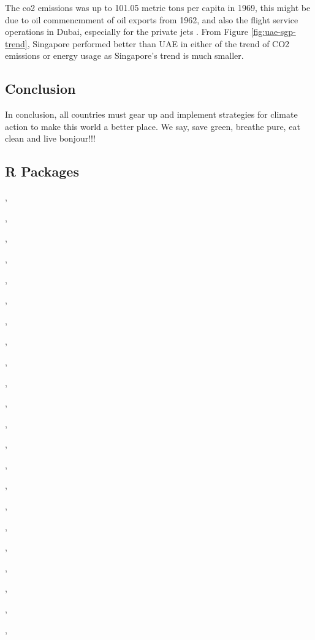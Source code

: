 \documentclass[11pt,a4paper,]{article}
\begin{document}
The co2 emissions was up to 101.05 metric tons per capita in 1969, this might be due to oil commencmment of oil exports from 1962, and also the flight service operations in Dubai, especially for the private jets \textcite{reuters_2010}. From Figure \ref{fig:uae-sgp-trend}, Singapore performed better than UAE in either of the trend of CO2 emissions or energy usage as Singapore's trend is much smaller.

\subsection*{Conclusion}

In conclusion, all countries must gear up and implement strategies for climate action to make this world a better place. We say, save green, breathe pure, eat clean and live bonjour!!!

\newpage

\subsection*{R Packages}

\textcite{R-base}

\textcite{R-bookdown}
\textcite{R-citation}
\textcite{R-dplyr},

\textcite{R-forcats},

\textcite{R-ggplot2},

\textcite{R-kableExtra},

\textcite{R-knitr},

\textcite{R-naniar},

\textcite{R-patchwork},

\textcite{R-purrr},

\textcite{R-readr},

\textcite{R-scales},

\textcite{R-stringr},

\textcite{R-tibble},

\textcite{R-tidyr},

\textcite{R-tidyverse},

\textcite{R-tinytex},

\textcite{R-visdat},

\textcite{bookdown2016},

\textcite{ggplot22016},

\textcite{knitr2015},

\textcite{knitr2014},

\textcite{tidyverse2019},

\textcite{tinytex2019},

\textcite{visdat2017}

\printbibliography
\end{document}
